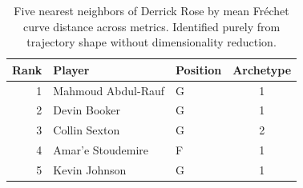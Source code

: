 \begin{table}[htbp]
  \centering\small
  \begin{tabular}{rllc}
    \toprule
    Rank & Player & Position & Archetype \\
    \midrule
    1 & Mahmoud Abdul-Rauf & G & 1 \\
    2 & Devin Booker & G & 1 \\
    3 & Collin Sexton & G & 2 \\
    4 & Amar'e Stoudemire & F & 1 \\
    5 & Kevin Johnson & G & 1 \\
    \bottomrule
  \end{tabular}
  \caption{Five nearest neighbors of Derrick Rose by mean Fr\'{e}chet curve distance across metrics. Identified purely from trajectory shape without dimensionality reduction.}
  \label{tab:Derrick_Rose_frechet_curve_neighbors}
\end{table}

